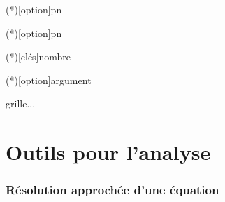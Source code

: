\documentclass[a4paper,french,11pt]{article}
\begin{document}
\begin{codetex}
\end{codetex}

\begin{codetex}
\Arrangement(*)[option]{p}{n}

\Combinaison(*)[option]{p}{n}
\end{codetex}

\begin{codetex}
\ConversionDecBin(*)[clés]{nombre}

\end{codetex}

\begin{codetex}
\ConversionFraction(*)[option]{argument}



\end{codetex}

\begin{codetex}
\begin{EnvSudoMaths}[options]{grille}...\end{EnvSudoMaths}
\end{codetex}

\newpage

\part{Outils pour l'analyse}

\section{Résolution approchée d'une équation}\label{resolapprox}
\end{document}
